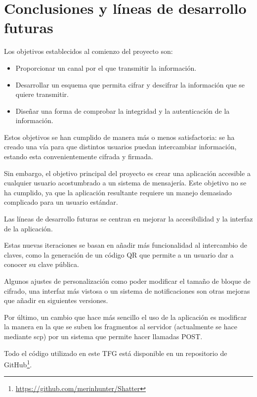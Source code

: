 
\chapter{Conclusiones y líneas de desarrollo futuras} %

\label{Chapter6} %


Los objetivos establecidos al comienzo del proyecto son:

\begin{itemize}
  \item Proporcionar un canal por el que transmitir la información.
  \item Desarrollar un esquema que permita cifrar y descifrar la información que se quiere transmitir.
  \item Diseñar una forma de comprobar la integridad y la autenticación de la información.
\end{itemize}

Estos objetivos se han cumplido de manera más o menos satisfactoria: se ha creado una vía para que distintos usuarios puedan intercambiar información, estando esta convenientemente cifrada y firmada.

Sin embargo, el objetivo principal del proyecto es crear una aplicación accesible a cualquier usuario acostumbrado a un sistema de mensajería. Este objetivo no se ha cumplido, ya que la aplicación resultante requiere un manejo demasiado complicado para un usuario estándar.

Las líneas de desarrollo futuras se centran en mejorar la accesibilidad y la interfaz de la aplicación.

Estas nuevas iteraciones se basan en añadir más funcionalidad al intercambio de claves, como la generación de un código QR que permite a un usuario dar a conocer su clave pública.

Algunos ajustes de personalización como poder modificar el tamaño de bloque de cifrado, una interfaz más vistosa o un sistema de notificaciones son otras mejoras que añadir en siguientes versiones.

Por último, un cambio que hace más sencillo el uso de la aplicación es modificar la manera en la que se suben los fragmentos al servidor (actualmente se hace mediante scp) por un sistema que permite hacer llamadas POST.

Todo el código utilizado en este TFG está disponible en un repositorio de GitHub\footnote{\url{https://github.com/merinhunter/Shatter}}.
